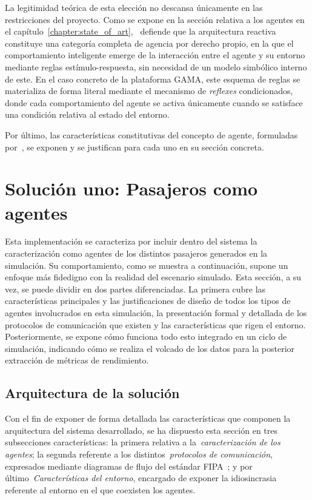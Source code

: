 La legitimidad teórica de esta elección no descansa únicamente en las restricciones del proyecto. Como se expone en la 
sección relativa a los agentes en el capítulo~\ref{chapter:state_of_art},~\textcite{brooks1991representation} 
defiende que la arquitectura 
reactiva constituye una categoría completa de agencia por derecho propio, en la que el comportamiento inteligente emerge de 
la interacción entre el agente y su entorno mediante reglas estímulo-respuesta, sin necesidad de un modelo simbólico interno 
de este. En el caso concreto de la plataforma GAMA, este esquema de reglas se materializa de forma literal 
mediante el mecanismo de \textit{reflexes} condicionados, donde cada comportamiento del agente se activa únicamente cuando se 
satisface una condición relativa al estado del entorno.

Por último,  las características constitutivas del concepto de agente, formuladas por~\textcite{Wooldridge1995},
se exponen y se justifican para cada uno en su sección concreta.



\section{Solución uno: Pasajeros como agentes}
Esta implementación se caracteriza por incluir dentro del sistema la caracterización como agentes de los distintos pasajeros
generados en la simulación. Su comportamiento, como se muestra a continuación, supone un enfoque más fidedigno con la 
realidad del escenario simulado. Esta sección, a su vez, se puede dividir en dos partes diferenciadas. La primera  
cubre las características principales y las justificaciones de diseño de todos los tipos de agentes involucrados en esta simulación,
la presentación formal y detallada de los protocolos de comunicación que existen y las características que rigen el entorno.
Posteriormente, se expone cómo funciona todo esto integrado en un ciclo de simulación, indicando cómo se realiza el 
volcado de los datos para la posterior extracción de métricas de rendimiento.

\subsection{Arquitectura de la solución}
Con el fin de exponer de forma detallada las características que componen la arquitectura del sistema desarrollado, se ha dispuesto
esta sección en tres subsecciones características: la primera relativa a la~\textit{caracterización de los agentes}; la segunda 
referente a los distintos~\textit{protocolos de comunicación}, expresados mediante diagramas de flujo del
estándar FIPA~\cite{fipa2002specs}; y por último~\textit{Características del entorno}, encargado de exponer la idiosincrasia referente
al entorno en el que coexisten los agentes.


